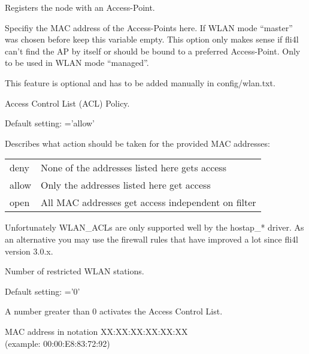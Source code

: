 \begin{description}

        Registers the node with an Access-Point.

        Specifiy the MAC address of the Access-Points here.
        If WLAN mode ``master'' was chosen before keep this variable empty.
        This option only makes sense if fli4l can't find the AP by itself or 
        should be bound to a preferred Access-Point. Only to be used in WLAN 
        mode ``managed''.

        This feature is optional and has to be added manually in config/wlan.txt.


        Access Control List (ACL) Policy.

        Default setting: ='allow'

        Describes what action should be taken for the provided MAC addresses:

        \begin{tabular}[h]{ll}
          deny  & None of the addresses listed here gets access\\
          allow & Only the addresses listed here get access\\
          open  & All MAC addresses get access independent on filter\\
        \end{tabular}
        
        Unfortunately WLAN\_ACLs are only supported well by the hostap\_* driver.
        As an alternative you may use the firewall rules that have improved a lot 
        since fli4l version 3.0.x.


        Number of restricted WLAN stations.

        Default setting: ='0'

        A number greater than 0 activates the Access Control List.
        

        MAC address in notation XX:XX:XX:XX:XX:XX \\
        (example: 00:00:E8:83:72:92)



\end{description}
